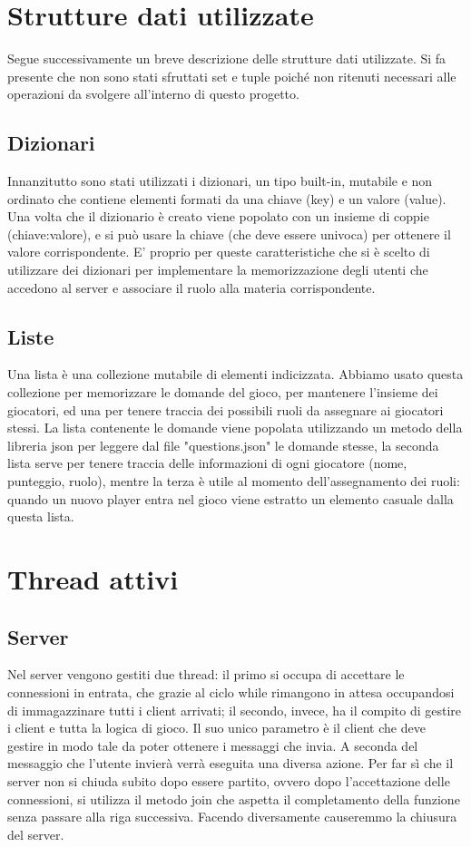 \documentclass[a4paper,12pt]{report}
\begin{document}
\chapter{Strutture dati utilizzate}
Segue successivamente un breve descrizione delle strutture dati utilizzate.
Si fa presente che non sono stati sfruttati set e tuple poiché non ritenuti necessari alle operazioni
da svolgere all'interno di questo progetto.

\section{Dizionari}
Innanzitutto sono stati utilizzati i dizionari, un tipo built-in, mutabile e non ordinato che contiene
elementi formati da una chiave (key) e un valore (value). Una volta che il dizionario è creato viene
popolato con un insieme di coppie (chiave:valore), e si può usare la chiave (che deve essere univoca) per
ottenere il valore corrispondente. E' proprio per queste caratteristiche che si è scelto di utilizzare
dei dizionari per implementare la memorizzazione degli utenti che accedono al server e associare il ruolo alla
materia corrispondente.

\section{Liste}
Una lista è una collezione mutabile di elementi indicizzata. Abbiamo usato questa collezione per memorizzare
le domande del gioco, per mantenere l'insieme dei giocatori, ed una per tenere traccia dei possibili ruoli da
assegnare ai giocatori stessi.
La lista contenente le domande viene popolata utilizzando un metodo della libreria json per leggere dal file
"questions.json" le domande stesse, la seconda lista serve per tenere traccia delle informazioni di ogni giocatore
(nome, punteggio, ruolo), mentre la terza è utile al momento dell'assegnamento dei ruoli: quando un nuovo player
entra nel gioco viene estratto un elemento casuale dalla questa lista.


\chapter{Thread attivi}

\section{Server}
Nel server vengono gestiti due thread: il primo si occupa di accettare le connessioni in entrata, 
che grazie al ciclo while rimangono in attesa occupandosi di immagazzinare tutti i client arrivati;
il secondo, invece, ha il compito di gestire i client e tutta la logica di gioco. Il suo unico parametro
è il client che deve gestire in modo tale da poter ottenere i messaggi che invia.
A seconda del messaggio che l’utente invierà verrà eseguita una diversa azione. Per far sì che il server
non si chiuda subito dopo essere partito, ovvero dopo l’accettazione delle connessioni, si utilizza il metodo
join che aspetta il completamento della funzione senza passare alla riga successiva.
Facendo diversamente causeremmo la chiusura del server.
\end{document}
